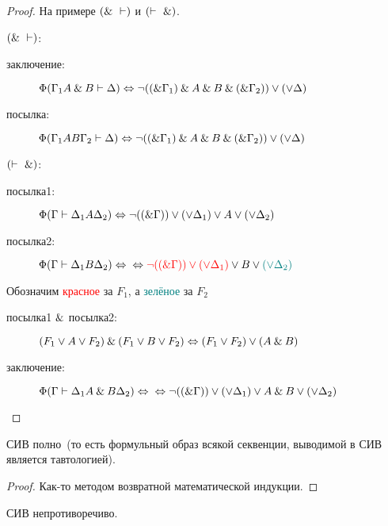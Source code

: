 \documentclass[main]{subfiles}
\begin{document}
\begin{proof}
    На примере $(\and\ \vdash)$ и $(\vdash \ \and)$.

    $(\and \ \vdash)$:

    \begin{description}
        \item[заключение: ] $\Phi(\Gamma_1 A\mathbin{\&} B \vdash \Delta) \Leftrightarrow \lnot((\mathbin{\&}\Gamma_1)\mathbin{\&} A\mathbin{\&} B\mathbin{\&} (\mathbin{\&} \Gamma_2))\lor (\lor\Delta)$
        \item[посылка: ] $\Phi(\Gamma_1 A B \Gamma_2 \vdash \Delta) \Leftrightarrow \lnot ((\mathbin{\&}\Gamma_1)\mathbin{\&} A\mathbin{\&} B\mathbin{\&} (\mathbin{\&} \Gamma_2))\lor (\lor\Delta)$
    \end{description}
    $(\vdash \ \and)$:
    \begin{description}
        \item[посылка1: ] $\Phi(\Gamma \vdash \Delta_1 A \Delta_2)\Leftrightarrow \lnot((\mathbin{\&} \Gamma)) \lor (\lor \Delta_1)\lor A\lor(\lor\Delta_2)$
        \item[посылка2: ] $\Phi(\Gamma \vdash \Delta_1 B \Delta_2)\Leftrightarrow \\ \Leftrightarrow \textcolor{red}{\lnot((\mathbin{\&} \Gamma)) \lor (\lor \Delta_1)}\lor B\lor\textcolor{teal}{(\lor\Delta_2)}$
    \end{description}
    Обозначим \textcolor{red}{красное} за $F_1$, а \textcolor{teal}{зелёное} за $F_2$
    \begin{description}
        \item[посылка1 $\mathbin{\&}$ посылка2: ] $(F_1 \lor A \lor F_2) \mathbin{\&} (F_1\lor B\lor F_2) \Leftrightarrow (F_1 \lor F_2) \lor(A \mathbin{\&} B)$
        \item[заключение: ] $\Phi(\Gamma \vdash \Delta_1 A\mathbin{\&} B \Delta_2) \Leftrightarrow \\ \Leftrightarrow \lnot((\mathbin{\&} \Gamma))\lor(\lor\Delta_1)\lor A\mathbin{\&} B \lor(\lor \Delta_2)$
    \end{description}
\end{proof}
\begin{theorem}
    СИВ полно~(то есть формульный образ всякой секвенции, выводимой в СИВ является тавтологией).
\end{theorem}
\begin{proof}
    Как-то методом возвратной математической индукции.
\end{proof}
\begin{theorem}
    СИВ непротиворечиво.
\end{theorem}
\end{document}
